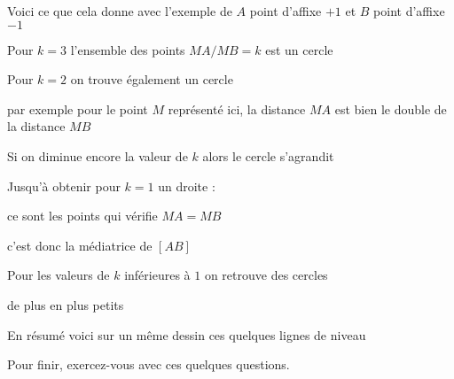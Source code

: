 \diapo

Voici ce que cela donne avec l'exemple de $A$ point d'affixe $+1$
et $B$ point d'affixe $-1$

\change

Pour $k=3$ l'ensemble des points $MA/MB=k$ est un cercle

\change

Pour $k=2$ on trouve également un cercle

\change

par exemple pour le point $M$ représenté ici, la distance $MA$
est bien le double de la distance $MB$

\change

Si on diminue encore la valeur de $k$ alors le cercle s'agrandit

\change

Jusqu'à obtenir pour $k=1$ un droite :

ce sont les points qui vérifie $MA=MB$

c'est donc la médiatrice de $[AB]$

\change

Pour les valeurs de $k$ inférieures à $1$ on retrouve des cercles

\change

de plus en plus petits 

\change

\medskip

\change

En résumé voici sur un même dessin ces quelques lignes de niveau





\diapo


Pour finir, exercez-vous avec ces quelques questions.


